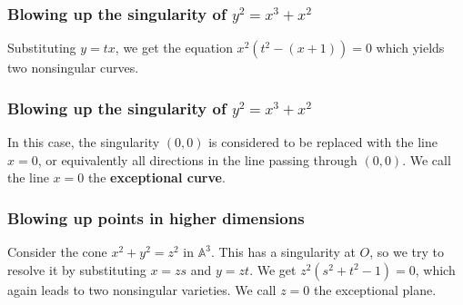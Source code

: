 \documentclass{beamer}
\begin{document}
\begin{frame}
\frametitle{Blowing up the singularity of $y^2 = x^3 + x^2$}

Substituting $y = tx$, we get the equation $x^2(t^2-(x+1)) = 0$ which yields two nonsingular curves.

\phantom{?}

\begin{minipage}{.5\textwidth}
\end{minipage}%
\begin{minipage}{.5\textwidth}
\end{minipage}

\end{frame}

\begin{frame}
\frametitle{Blowing up the singularity of $y^2 = x^3 + x^2$}

In this case, the singularity $(0,0)$ is considered to be replaced with the line $x=0$, or equivalently all directions in the line passing through $(0,0)$.
\pause\newline
We call the line $x= 0$ the \textbf{exceptional curve}.

\end{frame}
\begin{frame}
\frametitle{Blowing up points in higher dimensions}
\begin{example}
    Consider the cone $x^2 + y^2 = z^2$ in $\mathbb{A}^3$. This has a singularity at $O$, so we try to resolve it by substituting $x = zs$ and $y = zt$. We get $ z^2(s^2+t^2-1)=0$, which again leads to two nonsingular varieties. We call $z=0$ the exceptional plane.
\end{example}
\end{frame}
\end{document}
